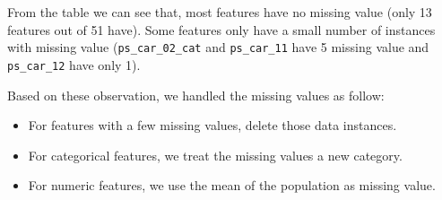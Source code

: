 \documentclass{standalone}
\begin{document}
From the table we can see that, most features have no missing value (only 13
features out of 51 have). Some features only have a small number of instances
with missing value (\lstinline{ps_car_02_cat} and \lstinline{ps_car_11} have 5
missing value and \lstinline{ps_car_12} have only 1).

Based on these observation, we handled the missing values as follow:

\begin{itemize}
    \item For features with a few missing values, delete those data instances.
    \item For categorical features, we treat the missing values a new category.
    \item For numeric features, we use the mean of the population as missing
        value.
\end{itemize}
\end{document}
